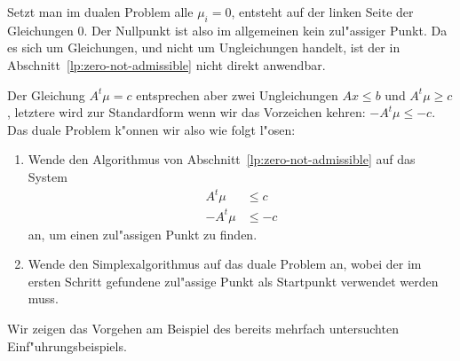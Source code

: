 Setzt man im dualen Problem alle $\mu_i=0$, entsteht auf der linken Seite
der Gleichungen $0$.
Der Nullpunkt ist also im allgemeinen kein zul"assiger Punkt.
Da es sich um Gleichungen, und nicht um Ungleichungen handelt, ist
der in Abschnitt~\ref{lp:zero-not-admissible} nicht direkt anwendbar.

Der Gleichung $A^t\mu=c$ entsprechen aber zwei Ungleichungen
$Ax\le b$ und $A^t\mu \ge c$, letztere wird zur Standardform wenn wir
das Vorzeichen kehren: $-A^t\mu\le -c$.
Das duale Problem k"onnen wir also wie folgt l"osen:
\begin{enumerate}
\item Wende den Algorithmus von Abschnitt~\ref{lp:zero-not-admissible} auf
das System
\begin{align*}
A^t \mu&\le c\\
-A^t\mu&\le -c
\end{align*}
an, um einen zul"assigen Punkt zu finden.
\item Wende den Simplexalgorithmus auf das duale Problem an, wobei
der im ersten Schritt gefundene zul"assige Punkt als Startpunkt verwendet
werden muss.
\end{enumerate}
Wir zeigen das Vorgehen am Beispiel des bereits mehrfach untersuchten
Einf"uhrungsbeispiels.

